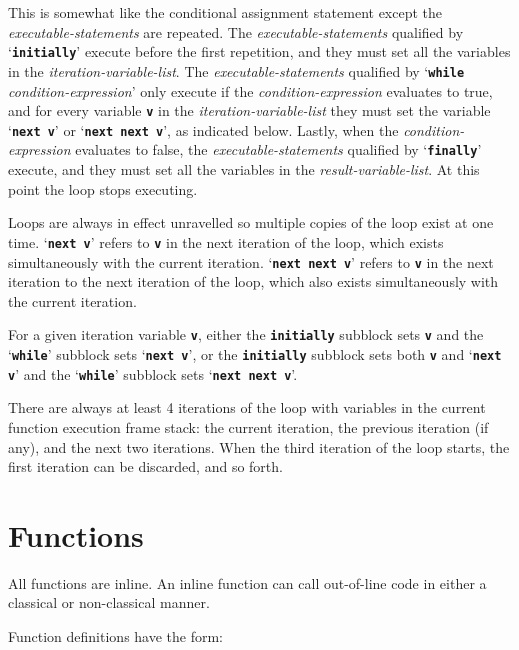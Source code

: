 \documentclass[12pt]{article}
\newcommand{\TT}[1]{{\tt \bfseries #1}}
\begin{document}
This is somewhat like the conditional assignment statement
except the {\em executable-statements} are repeated.  The
{\em executable-statements} qualified by `\TT{initially}'
execute before the first repetition, and they must
set all the variables in the {\em iteration-variable-list}.
The {\em executable-statements} qualified by `\TT{while}
{\em condition-expression}' only execute if the
{\em condition-expression} evaluates to true, and
for every variable \TT{v} in the {\em iteration-variable-list}
they must set the variable `\TT{next v}' or `\TT{next next v}',
as indicated below.
Lastly, when
the {\em condition-expression} evaluates to false, the
{\em executable-statements} qualified by `\TT{finally}'
execute, and they must set all the variables in the
{\em result-variable-list}.  At this point the loop stops
executing.

Loops are always in effect unravelled so multiple copies of
the loop exist at one time.  `\TT{next v}' refers to \TT{v} in the
next iteration of the loop, which exists simultaneously with
the current iteration.  `\TT{next next v}' refers to \TT{v}
in the next iteration to the next iteration of the loop, which
also exists simultaneously with the current iteration.

For a given iteration variable \TT{v},
either the \TT{initially} subblock sets \TT{v}
and the `\TT{while}' subblock sets `\TT{next v}',
or the \TT{initially} subblock sets both \TT{v} and `\TT{next v}'
and the `\TT{while}' subblock sets `\TT{next next v}'.

There are always at least 4 iterations of the loop with variables
in the current function execution frame stack: the current iteration,
the previous iteration (if any), and the next two iterations.
When the third iteration of the loop starts, the first
iteration can be discarded, and so forth.



\section{Functions}
\label{FUNCTIONS}

All functions are inline.  An inline function can call out-of-line
code in either a classical or non-classical manner.

Function definitions have the form:
\end{document}
